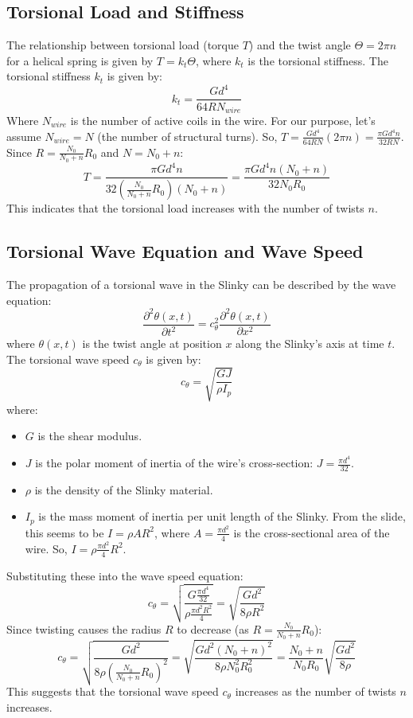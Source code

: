 \documentclass{mcmthesis}  %
\begin{document}
\subsection{Torsional Load and Stiffness}
The relationship between torsional load (torque \(T\)) and the twist angle \(\Theta = 2\pi n\) for a helical spring is given by \(T = k_t \Theta\), where \(k_t\) is the torsional stiffness.
The torsional stiffness \(k_t\) is given by:
\[ k_t = \frac{G d^4}{64 R N_{wire}} \]
Where \(N_{wire}\) is the number of active coils in the wire. For our purpose, let's assume \(N_{wire} = N\) (the number of structural turns).
So, \(T = \frac{G d^4}{64 R N} (2\pi n) = \frac{\pi G d^4 n}{32 R N}\).
Since \(R = \frac{N_0}{N_0+n} R_0\) and \(N = N_0+n\):
\[ T = \frac{\pi G d^4 n}{32 \left(\frac{N_0}{N_0+n} R_0\right) (N_0+n)} = \frac{\pi G d^4 n (N_0+n)}{32 N_0 R_0} \]
This indicates that the torsional load increases with the number of twists \(n\).

\subsection{Torsional Wave Equation and Wave Speed}
The propagation of a torsional wave in the Slinky can be described by the wave equation:
\[ \frac{\partial^2 \theta(x,t)}{\partial t^2} = c_{\theta}^2 \frac{\partial^2 \theta(x,t)}{\partial x^2} \]
where \(\theta(x,t)\) is the twist angle at position \(x\) along the Slinky's axis at time \(t\).
The torsional wave speed \(c_{\theta}\) is given by:
\[ c_{\theta} = \sqrt{\frac{GJ}{\rho I_p}} \]
where:
\begin{itemize}
    \item \(G\) is the shear modulus.
    \item \(J\) is the polar moment of inertia of the wire's cross-section: \(J = \frac{\pi d^4}{32}\).
    \item \(\rho\) is the density of the Slinky material.
    \item \(I_p\) is the mass moment of inertia per unit length of the Slinky. From the slide, this seems to be \(I = \rho A R^2\), where \(A = \frac{\pi d^2}{4}\) is the cross-sectional area of the wire. So, \(I = \rho \frac{\pi d^2}{4} R^2\).
\end{itemize}
Substituting these into the wave speed equation:
\[ c_{\theta} = \sqrt{\frac{G \frac{\pi d^4}{32}}{\rho \frac{\pi d^2 R^2}{4}}} = \sqrt{\frac{G d^2}{8 \rho R^2}} \]
Since twisting causes the radius \(R\) to decrease (as \(R = \frac{N_0}{N_0+n} R_0\)):
\[ c_{\theta} = \sqrt{\frac{G d^2}{8 \rho \left(\frac{N_0}{N_0+n} R_0\right)^2}} = \sqrt{\frac{G d^2 (N_0+n)^2}{8 \rho N_0^2 R_0^2}} = \frac{N_0+n}{N_0 R_0} \sqrt{\frac{G d^2}{8 \rho}} \]
This suggests that the torsional wave speed \(c_{\theta}\) increases as the number of twists \(n\) increases.
\end{document}
